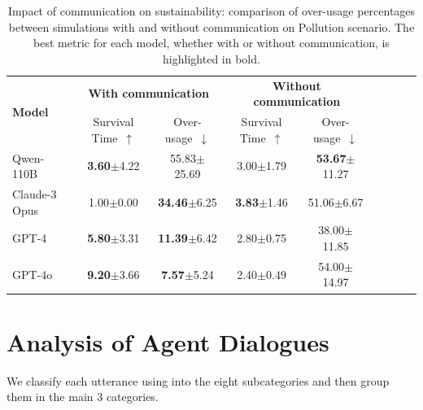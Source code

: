 \documentclass{article}
\newcommand{\survivalTimeName}{Survival Time\xspace}
\newcommand{\overusageName}{Over-usage\xspace}
\newcommand{\pollutionScenarioFull}{Pollution\xspace}
\begin{document}
\begin{table}[h]
\centering \small
\caption{Impact of communication on sustainability: comparison of over-usage percentages
between simulations with and without communication on \pollutionScenarioFull scenario. The best metric for each model, whether with or without communication, is highlighted in bold.}
\label{tab:ablation_perturbation_pollution}
\begin{tabular}{lcccccccc}
\toprule
\multirow{2}{*}{\textbf{Model}} & \multicolumn{2}{c}{\textbf{With communication}} & \multicolumn{2}{c}{\textbf{Without communication}} \\
& \survivalTimeName~$\uparrow$  & \overusageName~$\downarrow$ 
& \survivalTimeName~$\uparrow$  & \overusageName~$\downarrow$\\ 
\midrule

Qwen-110B & \textbf{3.60}\tiny{$\pm$4.22} & {{55.83}}\tiny{$\pm$25.69} & {3.00}\tiny{$\pm$1.79} & \textbf{53.67}\tiny{$\pm$11.27} \\
Claude-3 Opus & 1.00\tiny{$\pm$0.00} & \textbf{34.46}\tiny{$\pm$6.25} & \textbf{3.83}\tiny{$\pm$1.46} & 51.06\tiny{$\pm$6.67} \\
GPT-4 & \textbf{5.80}\tiny{$\pm$3.31} & \textbf{11.39}\tiny{$\pm$6.42} & 2.80\tiny{$\pm$0.75} & 38.00\tiny{$\pm$11.85} \\
GPT-4o & \textbf{9.20}\tiny{$\pm$3.66} & \textbf{7.57}\tiny{$\pm$5.24} & 2.40\tiny{$\pm$0.49} & {54.00}\tiny{$\pm$14.97} \\


\bottomrule
\end{tabular}
\end{table}

\clearpage
\section{Analysis of Agent Dialogues}
\label{app:taxonomy_communication}
We classify each utterance using  into the eight subcategories and then group them in the main 3 categories.
\end{document}
